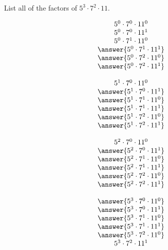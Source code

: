 \documentclass[nooutcomes]{ximera}
\begin{document}
\newpage 
\begin{problem}
List all of the factors of $5^3\cdot7^2\cdot11$. 

\begin{solution}
\[
\begin{array}{c}
5^0\cdot7^0\cdot11^0 \\
5^0\cdot7^0\cdot11^1 \\
5^0\cdot7^1\cdot11^0 \\
\answer{5^0\cdot7^1\cdot11^1} \\
\answer{5^0\cdot7^2\cdot11^0} \\
\answer{5^0\cdot7^2\cdot11^1} \\ \\
5^1\cdot7^0\cdot11^0 \\
\answer{5^1\cdot7^0\cdot11^1} \\
\answer{5^1\cdot7^1\cdot11^0} \\
\answer{5^1\cdot7^1\cdot11^1} \\
\answer{5^1\cdot7^2\cdot11^0} \\
\answer{5^1\cdot7^2\cdot11^1} \\ \\
5^2\cdot7^0\cdot11^0 \\
\answer{5^2\cdot7^0\cdot11^1} \\
\answer{5^2\cdot7^1\cdot11^0} \\
\answer{5^2\cdot7^1\cdot11^1} \\
\answer{5^2\cdot7^2\cdot11^0} \\
\answer{5^2\cdot7^2\cdot11^1} \\ \\
\answer{5^3\cdot7^0\cdot11^0} \\
\answer{5^3\cdot7^0\cdot11^1} \\
\answer{5^3\cdot7^1\cdot11^0} \\
\answer{5^3\cdot7^1\cdot11^1} \\
\answer{5^3\cdot7^2\cdot11^0} \\
5^3\cdot7^2\cdot11^1
\end{array}
\]
\end{solution}
\end{problem}
\end{document}
